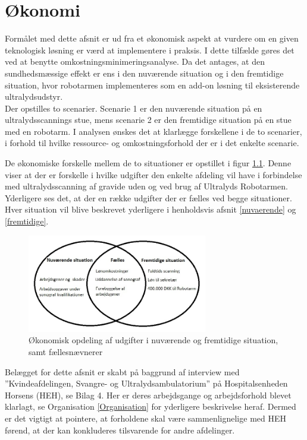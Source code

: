 \chapter{Økonomi} \label{Okonomi}
Formålet med dette afsnit er ud fra et økonomisk aspekt at vurdere om en given teknologisk løsning er værd at implementere i praksis. I dette tilfælde gøres det ved at benytte omkostningsminimeringsanalyse. Da det antages, at den sundhedsmæssige effekt er ens i den nuværende situation og i den fremtidige situation, hvor robotarmen implementeres som en add-on løsning til eksisterende ultralydsudstyr. \\
Der opstilles to scenarier. Scenarie 1 er den nuværende situation på en ultralydsscannings stue, mens scenarie 2 er den fremtidige situation på en stue med en robotarm. I analysen ønskes det at klarlægge forskellene i de to scenarier, i forhold til hvilke ressource- og omkostningsforhold der er i det enkelte scenarie. 

De økonomiske forskelle mellem de to situationer er opstillet i figur \ref{ModelOkonomi}. Denne viser at der er forskelle i hvilke udgifter den enkelte afdeling vil have i forbindelse med ultralydsscanning af gravide uden og ved brug af Ultralyds Robotarmen. Yderligere ses det, at der en række udgifter der er fælles ved begge situationer. Hver situation vil blive beskrevet yderligere i henholdsvis afsnit \ref{nuvaerende} og \ref{fremtidige}. 

\begin{figure}[H]\centering
	\includegraphics[width = 0.7\textwidth]{Figurer/ModelOkonomi}
	\caption{Økonomisk opdeling af udgifter i nuværende og fremtidige situation, samt fællesnævnerer}
	\label{ModelOkonomi}
\end{figure}

Belægget for dette afsnit er skabt på baggrund af interview med ”Kvindeafdelingen, Svangre- og Ultralydsambulatorium” på Hospitalsenheden Horsens (HEH), se Bilag 4. Her er deres arbejdsgange og arbejdsforhold blevet klarlagt, se Organisation \ref{Organisation} for yderligere beskrivelse heraf. Dermed er det vigtigt at pointere, at forholdene skal være sammenlignelige med HEH førend, at der kan konkluderes tilsvarende for andre afdelinger.

